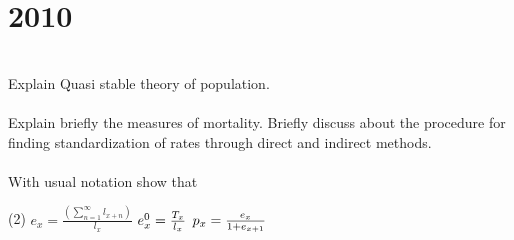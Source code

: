 \section*{2010}
\vspace{-.5cm}
\hrulefill \smallskip\\
 Explain Quasi stable theory of population.
\\\\
 Explain briefly the measures of mortality. Briefly discuss about the procedure for finding standardization of rates through direct and indirect methods.
\\\\
 With usual notation show that 
{\Large
\begin{tasks}[](2)
    \task $e_x = \frac{\left(\sum\limits_{n=1}^{\infty} l_{x+n}\right)}{l_x}$
    \task $e_{x}^{0} =  \frac{T_x\mathstrut}{l_x}$
    \task $p_x = \frac{e_x\mathstrut}{1 + e_{x+1}}$
\end{tasks}}
